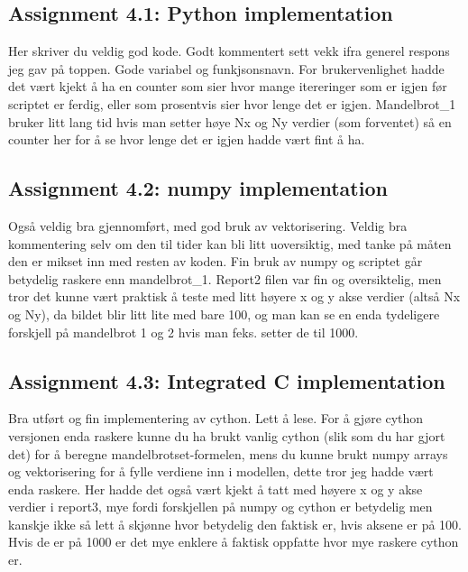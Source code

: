 \documentclass[a4paper]{article}
\begin{document}
\subsection*{Assignment 4.1: Python implementation}
Her skriver du veldig god kode. Godt kommentert sett vekk ifra generel respons jeg gav på toppen. Gode
variabel og funkjsonsnavn. For brukervenlighet hadde det vært kjekt å ha en counter som sier hvor mange
itereringer som er igjen før scriptet er ferdig, eller som prosentvis sier hvor lenge det er igjen.
Mandelbrot\_1 bruker litt lang tid hvis man setter høye Nx og Ny verdier (som forventet) så en counter her
for å se hvor lenge det er igjen hadde vært fint å ha.


\subsection*{Assignment 4.2:  numpy implementation} \label{sec:assignment5.2}
Også veldig bra gjennomført, med god bruk av vektorisering. Veldig bra kommentering selv om den til tider
kan bli litt uoversiktig, med tanke på måten den er mikset inn med resten av koden. Fin bruk av numpy og
scriptet går betydelig raskere enn mandelbrot\_1.
Report2 filen var fin og oversiktelig, men tror det kunne vært praktisk å teste med litt høyere x og y akse
verdier (altså Nx og Ny), da bildet blir litt lite med bare 100, og man kan se en enda tydeligere forskjell
på mandelbrot 1 og 2 hvis man feks. setter de til 1000.


\subsection*{Assignment 4.3: Integrated C implementation}
Bra utført og fin implementering av cython. Lett å lese. For å gjøre cython versjonen enda raskere kunne du ha brukt vanlig cython (slik som du har gjort det) for å beregne mandelbrotset-formelen, mens du kunne brukt numpy arrays og vektorisering for å fylle verdiene inn i modellen, dette tror jeg hadde vært enda raskere.
Her hadde det også vært kjekt å tatt med høyere x og y akse verdier i report3, mye fordi forskjellen på numpy og cython er betydelig men kanskje ikke så lett å skjønne hvor betydelig den faktisk er, hvis aksene er på 100. Hvis de er på 1000 er det mye enklere å faktisk oppfatte hvor mye raskere cython er.
\end{document}

